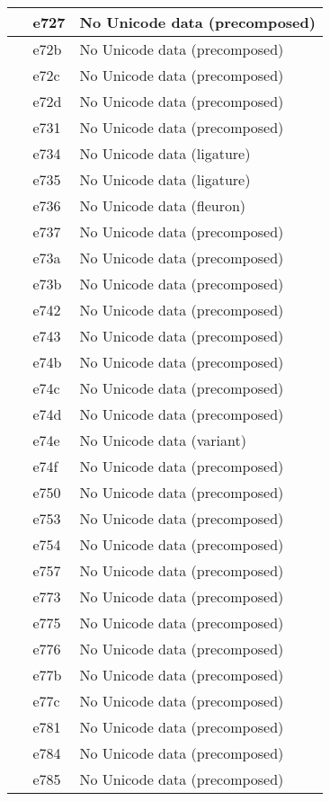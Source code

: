 \documentclass[12pt,letterpaper,openany]{book}
\begin{document}
\begin{center}
\begin{supertabular}{|m{0.25in}|m{0.5in}|m{4in}|}
 & e727 & No Unicode data (precomposed)\\\hline
 & e72b & No Unicode data (precomposed)\\\hline
 & e72c & No Unicode data (precomposed)\\\hline
 & e72d & No Unicode data (precomposed)\\\hline
 & e731 & No Unicode data (precomposed)\\\hline
 & e734 & No Unicode data (ligature)\\\hline
 & e735 & No Unicode data (ligature)\\\hline
 & e736 & No Unicode data (fleuron)\\\hline
 & e737 & No Unicode data (precomposed)\\\hline
 & e73a & No Unicode data (precomposed)\\\hline
 & e73b & No Unicode data (precomposed)\\\hline
 & e742 & No Unicode data (precomposed)\\\hline
 & e743 & No Unicode data (precomposed)\\\hline
 & e74b & No Unicode data (precomposed)\\\hline
 & e74c & No Unicode data (precomposed)\\\hline
 & e74d & No Unicode data (precomposed)\\\hline
 & e74e & No Unicode data (variant)\\\hline
 & e74f & No Unicode data (precomposed)\\\hline
 & e750 & No Unicode data (precomposed)\\\hline
 & e753 & No Unicode data (precomposed)\\\hline
 & e754 & No Unicode data (precomposed)\\\hline
 & e757 & No Unicode data (precomposed)\\\hline
 & e773 & No Unicode data (precomposed)\\\hline
 & e775 & No Unicode data (precomposed)\\\hline
 & e776 & No Unicode data (precomposed)\\\hline
 & e77b & No Unicode data (precomposed)\\\hline
 & e77c & No Unicode data (precomposed)\\\hline
 & e781 & No Unicode data (precomposed)\\\hline
 & e784 & No Unicode data (precomposed)\\\hline
 & e785 & No Unicode data (precomposed)\\\hline

\end{supertabular}
\end{center}
\end{document}
